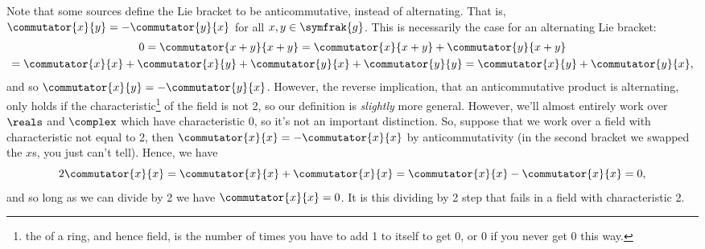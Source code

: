 \documentclass[fleqn]{NotesClass}
\renewcommand{\lie}[1]{\symfrak{#1}}
\begin{document}
    Note that some sources define the Lie bracket to be anticommutative, instead of alternating.
    That is, \(\commutator{x}{y} = -\commutator{y}{x}\) for all \(x, y \in \lie{g}\).
    This is necessarily the case for an alternating Lie bracket:
    \begin{multline}
        0 = \commutator{x + y}{x + y} = \commutator{x}{x + y} + \commutator{y}{x + y}\\
        = \commutator{x}{x} + \commutator{x}{y} + \commutator{y}{x} + \commutator{y}{y} = \commutator{x}{y} + \commutator{y}{x},
    \end{multline}
    and so \(\commutator{x}{y} = -\commutator{y}{x}\).
    However, the reverse implication, that an anticommutative product is alternating, only holds if the characteristic\footnote{the  of a ring, and hence field, is the number of times you have to add 1 to itself to get 0, or 0 if you never get 0 this way.} of the field is not 2, so our definition is \emph{slightly} more general.
    However, we'll almost entirely work over \(\reals\) and \(\complex\) which have characteristic 0, so it's not an important distinction.
    So, suppose that we work over a field with characteristic not equal to 2, then \(\commutator{x}{x} = -\commutator{x}{x}\) by anticommutativity (in the second bracket we swapped the \(x\)s, you just can't tell).
    Hence, we have
    \begin{equation}
        2 \commutator{x}{x} = \commutator{x}{x} + \commutator{x}{x} = \commutator{x}{x} - \commutator{x}{x} = 0,
    \end{equation}
    and so long as we can divide by 2 we have \(\commutator{x}{x} = 0\).
    It is this dividing by 2 step that fails in a field with characteristic 2.
    
\end{document}
